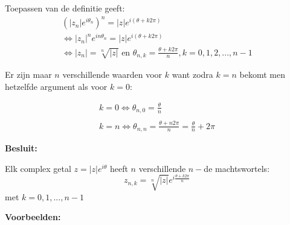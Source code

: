 Toepassen van de definitie geeft:\\

\[ \begin{array}{l}
(|z_{n}|e^{i \theta_{n}})^n = |z|e^{i(\theta + k 2 \pi)} \\
\iff |z_{n}|^n e^{i n \theta_{n}} = |z|e^{i(\theta + k 2 \pi)} \\ 
\iff |z_{n}|=\sqrt[n]{|z|} \text{ en } \theta_{n,k}=\frac{\theta + k 2 \pi}{n}, k=0,1,2,...,n-1 
\end{array} 
\]

Er zijn maar $n$ verschillende waarden voor $k$ want zodra $k=n$ bekomt men hetzelfde argument als voor $k=0$:

\[ \begin{array}{l}   
k=0 \iff \theta_{n,0}=\frac{\theta}{n} \\
\\
k=n \iff \theta_{n,n}=\frac{\theta + n 2\pi}{n}=\frac{\theta}{n} + 2\pi
\end{array}
\]

{\bf Besluit:}\\

\begin{framed}
	Elk complex getal $z=|z|e^{i \theta}$ heeft $n$ verschillende $n-$de machtswortels:\\
	\[ z_{n,k}=\sqrt[n]{|z|}e^{i\frac{\theta+k2 \pi}{n}}  \] 
	met $k=0,1,...,n-1$
\end{framed}


{\bf Voorbeelden:} \\

